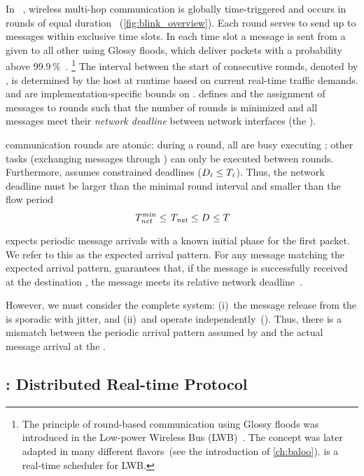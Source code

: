 In \blink~\cite{zimmerling2017Blink}, wireless multi-hop communication is globally time-triggered and occurs in {rounds} of equal {duration} \rlength~(\cref{fig:blink_overview}).
Each round serves to send up to \nslotsmax messages within exclusive time slots.
In each time slot a message is sent from a given \cp to all other \CPs using Glossy floods, which deliver packets with a probability above 99.9\,\%~\cite{ferrari2011Glossy}.%
%
\footnote{The principle of round-based communication using Glossy floods was introduced in the Low-power Wireless Bus (LWB)~\cite{ferrari2012LWB}. The concept was later adapted in many different flavors~(see the introduction of \cref{ch:baloo}).
\blink is a real-time scheduler for LWB.}
%
The interval between the start of consecutive rounds, denoted by \rperiod, is determined by the host at runtime based on current real-time traffic demands. \rperiodmin and \rperiodmax are implementation-specific bounds on \rperiod.
\blink defines \rperiod and the assignment of messages to rounds such that the number of rounds is minimized and all messages meet their \emph{network deadline} \ndeadlinei between network interfaces (\ie the \CPs).

\blink communication rounds are atomic: during a round, all \CPs are busy executing \blink; other tasks (\eg exchanging messages through \bolt) can only be executed between rounds.
Furthermore, \blink assumes constrained deadlines ($D_{\mathit{i}} \leq T_{\mathit{i}}$).
Thus, the network deadline \ndeadlineany must be larger than the minimal round interval and smaller than the flow period \periodany
\begin{equation}
  \mathit{T_{net}^{min}} \leq \mathit{T_{net}} \leq D_{\mathit{}} \leq T_{\mathit{}}
\end{equation}

\blink expects periodic message arrivals with a known initial phase for the first packet.
We refer to this as the expected arrival pattern.
For any message matching the expected arrival pattern,
\blink guarantees that, if the message is successfully received at the destination \cp, the message meets its relative network deadline~\ndeadlineany.%

However, we must consider the complete system:
(i)~the message release from the \APs is sporadic with jitter, and
(ii)~\APs and \CPs operate independently~(). Thus, there is a mismatch between the periodic arrival pattern assumed by \blink and the actual message arrival at the \CPs.

\subsection{\DRP: Distributed Real-time Protocol}
\label{subsec:drp}

